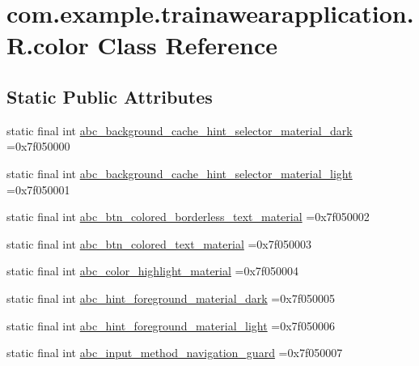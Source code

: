 \hypertarget{classcom_1_1example_1_1trainawearapplication_1_1_r_1_1color}{}\section{com.\+example.\+trainawearapplication.\+R.\+color Class Reference}
\label{classcom_1_1example_1_1trainawearapplication_1_1_r_1_1color}
\subsection*{Static Public Attributes}
\begin{DoxyCompactItemize}
\item 
static final int \mbox{\hyperlink{classcom_1_1example_1_1trainawearapplication_1_1_r_1_1color_a6581ed6caec163c0b54cc5f2a66d9a1f}{abc\+\_\+background\+\_\+cache\+\_\+hint\+\_\+selector\+\_\+material\+\_\+dark}} =0x7f050000
\item 
static final int \mbox{\hyperlink{classcom_1_1example_1_1trainawearapplication_1_1_r_1_1color_add7439e6a9feebb15ccbf3f34e356bfe}{abc\+\_\+background\+\_\+cache\+\_\+hint\+\_\+selector\+\_\+material\+\_\+light}} =0x7f050001
\item 
static final int \mbox{\hyperlink{classcom_1_1example_1_1trainawearapplication_1_1_r_1_1color_aa0b6c5a11a6601045140d31b5f947c84}{abc\+\_\+btn\+\_\+colored\+\_\+borderless\+\_\+text\+\_\+material}} =0x7f050002
\item 
static final int \mbox{\hyperlink{classcom_1_1example_1_1trainawearapplication_1_1_r_1_1color_abf60e0ac5ac2eb48108f68f2a3ff9cd7}{abc\+\_\+btn\+\_\+colored\+\_\+text\+\_\+material}} =0x7f050003
\item 
static final int \mbox{\hyperlink{classcom_1_1example_1_1trainawearapplication_1_1_r_1_1color_a7d6dfec3f057226d1c4a2115d459fd8a}{abc\+\_\+color\+\_\+highlight\+\_\+material}} =0x7f050004
\item 
static final int \mbox{\hyperlink{classcom_1_1example_1_1trainawearapplication_1_1_r_1_1color_ae63af2fb95a7be92bf741959f301147a}{abc\+\_\+hint\+\_\+foreground\+\_\+material\+\_\+dark}} =0x7f050005
\item 
static final int \mbox{\hyperlink{classcom_1_1example_1_1trainawearapplication_1_1_r_1_1color_a8ed6881fdb522325b32be424ff0389d2}{abc\+\_\+hint\+\_\+foreground\+\_\+material\+\_\+light}} =0x7f050006
\item 
static final int \mbox{\hyperlink{classcom_1_1example_1_1trainawearapplication_1_1_r_1_1color_a08932e045bda52afb66a308c9d0fcde7}{abc\+\_\+input\+\_\+method\+\_\+navigation\+\_\+guard}} =0x7f050007

\end{DoxyCompactItemize}
